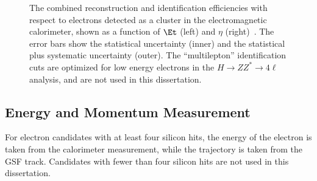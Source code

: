 \begin{figure}[htbp]
{		
	}
	\caption{The combined reconstruction and identification efficiencies with respect to electrons detected as a cluster in the electromagnetic calorimeter, shown as a function of $\Et$ (left) and $\eta$ (right)~\cite{TheATLASCollaboration:2014vz}. The error bars show the statistical uncertainty (inner) and the statistical plus systematic uncertainty (outer). The ``multilepton'' identification cuts are optimized for low energy electrons in the $H\rightarrow ZZ^*\rightarrow 4\ell$ analysis, and are not used in this dissertation.}
	\label{fig:electron-id-efficiencies}
\end{figure}


\subsection{Energy and Momentum Measurement}\label{sec:reco-electron-energymomentum}
For electron candidates with at least four silicon hits, the energy of the electron is taken from the calorimeter measurement, while the trajectory is taken from the GSF track. Candidates with fewer than four silicon hits are not used in this dissertation. 

